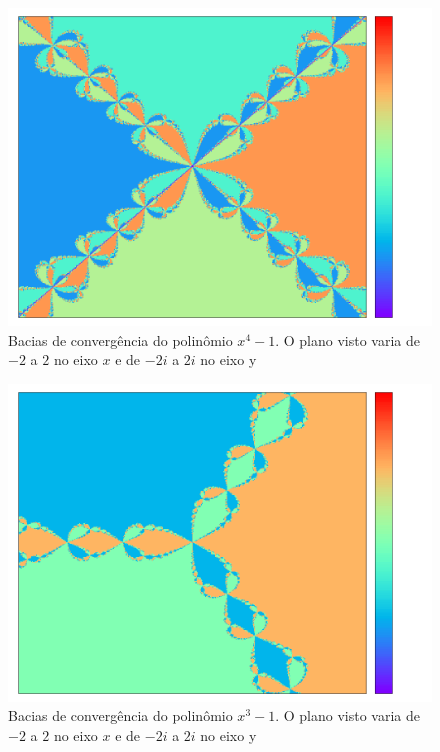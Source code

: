 \documentclass[12pt]{article}
\begin{document}
\begin{figure}[H]
    \begin{center}
        \includegraphics[scale = .4]{figures/x4-1}
    \end{center}
    \caption{Bacias de convergência do polinômio $x^4 - 1$. O plano
    visto varia de $-2$ a $2$ no eixo $x$ e de $-2i$ a $2i$ no eixo
    y}
    \label{fig:x4-1}
\end{figure}
\begin{figure}[H]
    \begin{center}
        \includegraphics[scale = .4]{figures/x3-1}
    \end{center}
    \caption{Bacias de convergência do polinômio $x^3 - 1$. O plano
    visto varia de $-2$ a $2$ no eixo $x$ e de $-2i$ a $2i$ no eixo
    y}
\end{figure}
\end{document}
